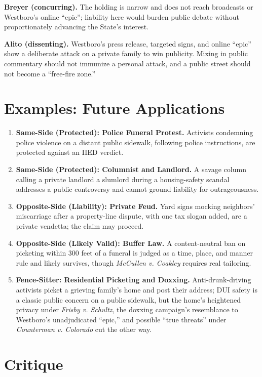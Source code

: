 \documentclass[12pt]{article}
\begin{document}
\textbf{Breyer (concurring).} The holding is narrow and does not reach broadcasts or Westboro's online ``epic''; liability here would burden public debate without proportionately advancing the State's interest.

\textbf{Alito (dissenting).} Westboro's press release, targeted signs, and online ``epic'' show a deliberate attack on a private family to win publicity. Mixing in public commentary should not immunize a personal attack, and a public street should not become a ``free-fire zone.''

\section{Examples: Future Applications}

\begin{enumerate}
\item \textbf{Same-Side (Protected): Police Funeral Protest.} Activists condemning police violence on a distant public sidewalk, following police instructions, are protected against an IIED verdict.
\item \textbf{Same-Side (Protected): Columnist and Landlord.} A savage column calling a private landlord a slumlord during a housing-safety scandal addresses a public controversy and cannot ground liability for outrageousness.
\item \textbf{Opposite-Side (Liability): Private Feud.} Yard signs mocking neighbors' miscarriage after a property-line dispute, with one tax slogan added, are a private vendetta; the claim may proceed.
\item \textbf{Opposite-Side (Likely Valid): Buffer Law.} A content-neutral ban on picketing within 300 feet of a funeral is judged as a time, place, and manner rule and likely survives, though \textit{McCullen v. Coakley} requires real tailoring.
\item \textbf{Fence-Sitter: Residential Picketing and Doxxing.} Anti-drunk-driving activists picket a grieving family's home and post their address; DUI safety is a classic public concern on a public sidewalk, but the home's heightened privacy under \textit{Frisby v. Schultz}, the doxxing campaign's resemblance to Westboro's unadjudicated ``epic,'' and possible ``true threats'' under \textit{Counterman v. Colorado} cut the other way.
\end{enumerate}

\section{Critique}
\end{document}
